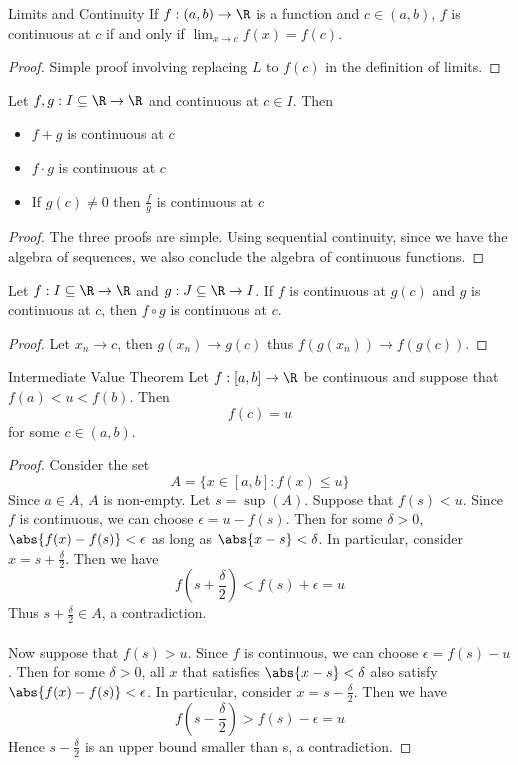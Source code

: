 \begin{thm}{Limits and Continuity}{} If $f:(a,b)\to\R$ is a function and $c\in(a,b)$, $f$ is continuous at $c$ if and only if $\lim_{x\to c}f(x)=f(c)$. \tcbline
\begin{proof} Simple proof involving replacing $L$ to $f(c)$ in the definition of limits. 
\end{proof}
\end{thm}

\begin{prp}{}{} Let $f,g:I\subseteq\R\to\R$ and continuous at $c\in I$. Then
\begin{itemize}
\item $f+g$ is continuous at $c$
\item $f\cdot g$ is continuous at $c$
\item If $g(c)\neq0$ then $\frac{f}{g}$ is continuous at $c$
\end{itemize}\tcbline
\begin{proof} The three proofs are simple. Using sequential continuity, since we have the algebra of sequences, we also conclude the algebra of continuous functions. 
\end{proof}
\end{prp}

\begin{prp}{}{} Let $f:I\subseteq\R\to\R$ and $g:J\subseteq\R\to I$. If $f$ is continuous at $g(c)$ and $g$ is continuous at $c$, then $f\circ g$ is continuous at $c$. \tcbline
\begin{proof} Let $x_n\to c$, then $g(x_n)\to g(c)$ thus $f(g(x_n))\to f(g(c))$. 
\end{proof}
\end{prp}

\begin{thm}{Intermediate Value Theorem}{} Let $f:[a,b]\to\R$ be continuous and suppose that $f(a)<u<f(b)$. Then $$f(c)=u$$ for some $c\in(a,b)$.\tcbline
\begin{proof} Consider the set $$A=\{x\in[a,b]:f(x)\leq u\}$$ Since $a\in A$, $A$ is non-empty. Let $s=\sup(A)$. Suppose that $f(s)<u$. Since $f$ is continuous, we can choose $\epsilon=u-f(s)$. Then for some $\delta>0$, $\abs{f(x)-f(s)}<\epsilon$ as long as $\abs{x-s}<\delta$. In particular, consider $x=s+\frac{\delta}{2}$. Then we have $$f\left(s+\frac{\delta}{2}\right)<f(s)+\epsilon=u$$ Thus $s+\frac{\delta}{2}\in A$, a contradiction. \\~\\
Now suppose that $f(s)>u$. Since $f$ is continuous, we can choose $\epsilon=f(s)-u$. Then for some $\delta>0$, all $x$ that satisfies $\abs{x-s}<\delta$ also satisfy $\abs{f(x)-f(s)}<\epsilon$. In particular, consider $x=s-\frac{\delta}{2}$. Then we have $$f\left(s-\frac{\delta}{2}\right)>f(s)-\epsilon=u$$ Hence $s-\frac{\delta}{2}$ is an upper bound smaller than s, a contradiction. 
\end{proof}
\end{thm}

